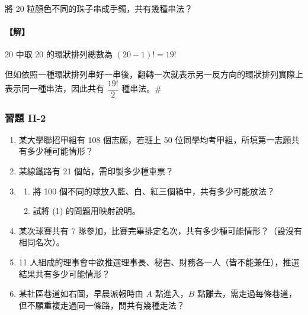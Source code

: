 \begin{example}\label{ex:b5-2-13}
將 20 粒顏色不同的珠子串成手鐲，共有幾種串法？
\end{example}
\paragraph{【解】}
20 中取 20 的環狀排列總數為 $(20-1)! = 19!$

但如依照一種環狀排列串好一串後，翻轉一次就表示另一反方向的環狀排列實際上表示同一種串法，因此共有 $\dfrac{19!}{2}$ 種串法。\hfill\#

\subsubsection*{習題 II-2}

\begin{enumerate}[label=\arabic*., topsep=4pt, itemsep=6pt]
  \item 某大學聯招甲組有 108 個志願，若班上 50 位同學均考甲組，所填第一志願共有多少種可能情形？
  \item 某線鐵路有 21 個站，需印製多少種車票？
  \item
  \begin{enumerate}[label=(\arabic*), topsep=2pt, itemsep=2pt]
    \item 將 100 個不同的球放入藍、白、紅三個箱中，共有多少可能放法？
    \item 試將 (1) 的問題用映射說明。
  \end{enumerate}
  \item 某次球賽共有 7 隊參加，比賽完畢排定名次，共有多少種可能情形？（設沒有相同名次）。
  \item 11 人組成的理事會中欲推選理事長、秘書、財務各一人（皆不能兼任），推選結果共有多少可能情形？
  \item
  \begin{minipage}[t]{0.68\linewidth}
  某社區巷道如右圖，\footnotemark 早晨派報時由 $A$ 點進入，$B$ 點離去，需走過每條巷道，但不願重複走過同一條路，問共有幾種走法？
  \end{minipage}\hfill
  \begin{minipage}[t]{0.30\linewidth}
  \centering
  \end{minipage}%
  \label{note:b5-ch2-p75-q6-quote}


\end{enumerate}
